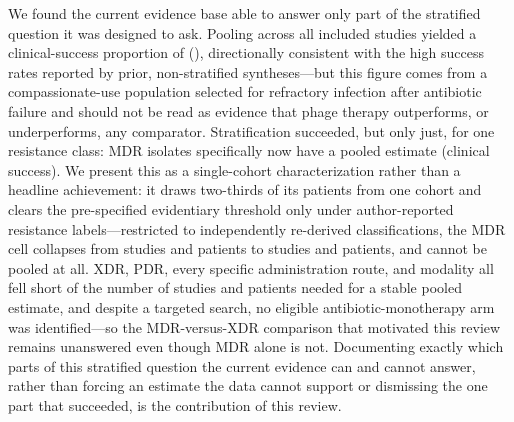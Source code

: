 We found the current evidence base able to answer only part of the stratified question it was designed to ask. Pooling across all included studies yielded a clinical-success proportion of \CsOverallEst(\CsOverallCI), directionally consistent with the high success rates reported by prior, non-stratified syntheses---but this figure comes from a compassionate-use population selected for refractory infection after antibiotic failure and should not be read as evidence that phage therapy outperforms, or underperforms, any comparator. Stratification succeeded, but only just, for one resistance class: MDR isolates specifically now have a pooled estimate (\CsResMDREstCI clinical success). We present this as a single-cohort characterization rather than a headline achievement: it draws two-thirds of its patients from one cohort and clears the pre-specified evidentiary threshold only under author-reported resistance labels---restricted to independently re-derived classifications, the MDR cell collapses from \ClassMDRStudiesAll studies and \ClassMDRPatientsAll patients to \ClassMDRStudiesVerified studies and \ClassMDRPatientsVerified patients, and cannot be pooled at all. XDR, PDR, every specific administration route, and modality all fell short of the number of studies and patients needed for a stable pooled estimate, and despite a targeted search, no eligible antibiotic-monotherapy arm was identified---so the MDR-versus-XDR comparison that motivated this review remains unanswered even though MDR alone is not. Documenting exactly which parts of this stratified question the current evidence can and cannot answer, rather than forcing an estimate the data cannot support or dismissing the one part that succeeded, is the contribution of this review.
